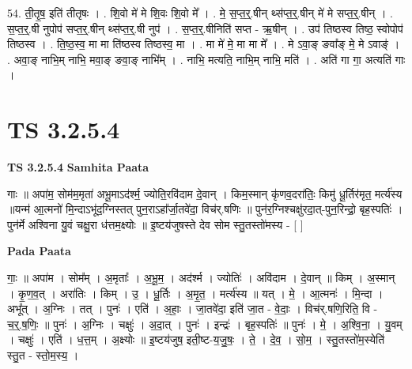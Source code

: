 \documentclass[17pt]{extarticle}
\begin{document}
54. ती॒तृ॒ष॒ इति॑ तीतृषः । . शि॒वो मे॑ मे शि॒वः शि॒वो मे᳚ । . मे॒ स॒प्त॒र्॒.षीन् थ्स॑प्त॒र्॒.षीन् मे॑ मे सप्त॒र्॒.षीन् । . स॒प्त॒र्॒.षी नुपोप॑ सप्त॒र्॒.षीन् थ्स॑प्त॒र्॒.षी नुप॑ । . स॒प्त॒र्॒.षीनिति॑ सप्त - ऋ॒षीन् । . उप॑ तिष्ठस्व तिष्ठ॒ स्वोपोप॑ तिष्ठस्व । . ति॒ष्ठ॒स्व॒ मा मा ति॑ष्ठस्व तिष्ठस्व॒ मा । . मा मे॑ मे॒ मा मा मे᳚ । . मे ऽवा॒ङ् ङवा᳚ङ् मे॒ मे ऽवाङ्॑ । . अवा॒ङ् नाभि॒म् नाभि॒ मवा॒ङ् ङवा॒ङ् नाभि᳚म् । . नाभि॒ मत्यति॒ नाभि॒म् नाभि॒ मति॑ । . अति॑ गा गा॒ अत्यति॑ गाः । \newline


\section{ TS 3.2.5.4 }

\textbf{TS 3.2.5.4 } \newline
\textbf{Samhita Paata} \newline

गाः ॥ अपा॑म॒ सोम॑म॒मृता॑ अभू॒माऽद॑र्श्म॒ ज्योति॒रवि॑दाम दे॒वान् । किम॒स्मान् कृ॑णव॒दरा॑तिः॒ किमु॑ धू॒र्तिर॑मृत॒ मर्त्य॑स्य ॥यन्म॑ आ॒त्मनो॑ मि॒न्दाऽभू॑द॒ग्निस्तत् पुन॒राऽहा᳚र्जा॒तवे॑दा॒ विच॑र्.षणिः ॥ पुन॑र॒ग्निश्चक्षु॑रदा॒त्-पुन॒रिन्द्रो॒ बृह॒स्पतिः॑ । पुन॑र्मे अश्विना यु॒वं चक्षु॒रा ध॑त्तम॒क्ष्योः ॥ इ॒ष्टय॑जुषस्ते देव सोम स्तु॒तस्तो॑मस्य - [  ] \newline

\textbf{Pada Paata} \newline

गाः॒ ॥ अपा॑म । सोम᳚म् । अ॒मृताः᳚ । अ॒भू॒म॒ । अद॑र्श्म । ज्योतिः॑ । अवि॑दाम । दे॒वान् ॥ किम् । अ॒स्मान् । कृ॒ण॒व॒त् । अरा॑तिः । किम् । उ॒ । धू॒र्तिः । अ॒मृ॒त॒ । मर्त्य॑स्य ॥ यत् । मे॒ । आ॒त्मनः॑ । मि॒न्दा । अभू᳚त् । अ॒ग्निः । तत् । पुनः॑ । एति॑ । अ॒हाः॒ । जा॒तवे॑दा॒ इति॑ जा॒त - वे॒दाः॒ । विच॑र्.षणि॒रिति॒ वि - च॒र्॒.ष॒णिः॒ ॥ पुनः॑ । अ॒ग्निः । चक्षुः॑ । अ॒दा॒त् । पुनः॑ । इन्द्रः॑ । बृह॒स्पतिः॑ ॥ पुनः॑ । मे॒ । अ॒श्वि॒ना॒ । यु॒वम् । चक्षुः॑ । एति॑ । ध॒त्त॒म् । अ॒क्ष्योः ॥ इ॒ष्टय॑जुष॒ इती॒ष्ट-य॒जु॒षः॒ । ते॒ । दे॒व॒ । सो॒म॒ । स्तु॒तस्तो॑म॒स्येति॑ स्तु॒त - स्तो॒म॒स्य॒ ।  \newline
\end{document}
